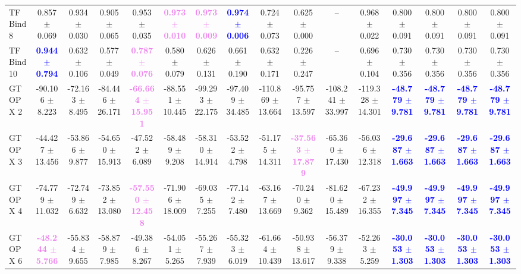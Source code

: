 \begin{table}[t!]
{\begin{tabular}{l|*{15}{c}}
TF Bind 8 & 0.857 $\pm$ 0.069 & 0.934 $\pm$ 0.030 & 0.905 $\pm$ 0.065 & 0.953 $\pm$ 0.035 & \textbf{\textcolor{violet}{0.973 $\pm$ 0.010}} & \textbf{\textcolor{violet}{0.973 $\pm$ 0.009}} & \textbf{\textcolor{blue}{0.974 $\pm$ 0.006}} & 0.724 $\pm$ 0.073 & 0.625 $\pm$ 0.000 & -- & 0.968 $\pm$ 0.022 & 0.800 $\pm$ 0.091 & 0.800 $\pm$ 0.091 & 0.800 $\pm$ 0.091 & 0.800 $\pm$ 0.091 \\
TF Bind 10 & \textbf{\textcolor{blue}{0.944 $\pm$ 0.794}} & 0.632 $\pm$ 0.106 & 0.577 $\pm$ 0.049 & \textbf{\textcolor{violet}{0.787 $\pm$ 0.076}} & 0.580 $\pm$ 0.079 & 0.626 $\pm$ 0.131 & 0.661 $\pm$ 0.190 & 0.632 $\pm$ 0.171 & 0.226 $\pm$ 0.247 & -- & 0.696 $\pm$ 0.104 & 0.730 $\pm$ 0.356 & 0.730 $\pm$ 0.356 & 0.730 $\pm$ 0.356 & 0.730 $\pm$ 0.356 \\
GTOPX 2 & -90.106 $\pm$ 8.223 & -72.163 $\pm$ 8.495 & -84.446 $\pm$ 26.171 & \textbf{\textcolor{violet}{-66.664 $\pm$ 15.951}} & -88.551 $\pm$ 10.445 & -99.293 $\pm$ 22.175 & -97.409 $\pm$ 34.485 & -110.869 $\pm$ 13.664 & -95.757 $\pm$ 13.597 & -108.241 $\pm$ 33.997 & -119.328 $\pm$ 14.301 & \textbf{\textcolor{blue}{-48.779 $\pm$ 9.781}} & \textbf{\textcolor{blue}{-48.779 $\pm$ 9.781}} & \textbf{\textcolor{blue}{-48.779 $\pm$ 9.781}} & \textbf{\textcolor{blue}{-48.779 $\pm$ 9.781}} \\
GTOPX 3 & -44.427 $\pm$ 13.456 & -53.866 $\pm$ 9.877 & -54.650 $\pm$ 15.913 & -47.522 $\pm$ 6.089 & -58.489 $\pm$ 9.208 & -58.310 $\pm$ 14.914 & -53.522 $\pm$ 4.798 & -51.175 $\pm$ 14.311 & \textbf{\textcolor{violet}{-37.563 $\pm$ 17.879}} & -65.360 $\pm$ 17.430 & -56.036 $\pm$ 12.318 & \textbf{\textcolor{blue}{-29.687 $\pm$ 1.663}} & \textbf{\textcolor{blue}{-29.687 $\pm$ 1.663}} & \textbf{\textcolor{blue}{-29.687 $\pm$ 1.663}} & \textbf{\textcolor{blue}{-29.687 $\pm$ 1.663}} \\
GTOPX 4 & -74.779 $\pm$ 11.032 & -72.749 $\pm$ 6.632 & -73.852 $\pm$ 13.080 & \textbf{\textcolor{violet}{-57.550 $\pm$ 12.458}} & -71.906 $\pm$ 18.009 & -69.035 $\pm$ 7.255 & -77.142 $\pm$ 7.480 & -63.167 $\pm$ 13.669 & -70.240 $\pm$ 9.362 & -81.620 $\pm$ 15.489 & -67.232 $\pm$ 16.355 & \textbf{\textcolor{blue}{-49.997 $\pm$ 7.345}} & \textbf{\textcolor{blue}{-49.997 $\pm$ 7.345}} & \textbf{\textcolor{blue}{-49.997 $\pm$ 7.345}} & \textbf{\textcolor{blue}{-49.997 $\pm$ 7.345}} \\
GTOPX 6 & \textbf{\textcolor{violet}{-48.244 $\pm$ 5.766}} & -55.834 $\pm$ 9.655 & -58.879 $\pm$ 7.985 & -49.386 $\pm$ 8.267 & -54.051 $\pm$ 5.265 & -55.267 $\pm$ 7.939 & -55.323 $\pm$ 6.019 & -61.664 $\pm$ 10.439 & -50.938 $\pm$ 13.617 & -56.379 $\pm$ 9.338 & -52.263 $\pm$ 5.259 & \textbf{\textcolor{blue}{-30.053 $\pm$ 1.303}} & \textbf{\textcolor{blue}{-30.053 $\pm$ 1.303}} & \textbf{\textcolor{blue}{-30.053 $\pm$ 1.303}} & \textbf{\textcolor{blue}{-30.053 $\pm$ 1.303}} \\

\end{tabular}}
\end{table}
